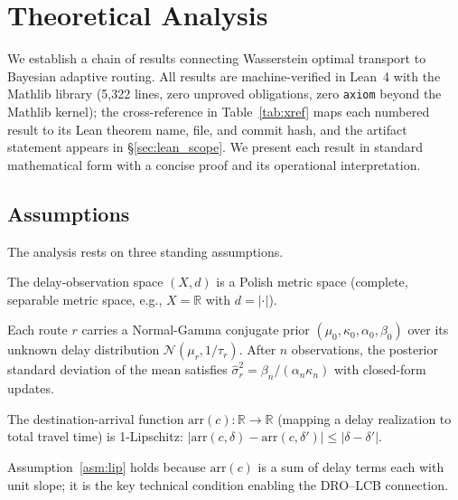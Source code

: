 \documentclass[opre,dblanonrev]{informs4}
\begin{document}
\section{Theoretical Analysis}
\label{sec:lean}

We establish a chain of results connecting Wasserstein optimal transport
to Bayesian adaptive routing.
All results are machine-verified in Lean~4 with the Mathlib library
(5{,}322 lines, zero unproved obligations, zero \texttt{axiom}
beyond the Mathlib kernel); the cross-reference in
Table~\ref{tab:xref} maps each numbered result to its Lean theorem
name, file, and commit hash, and the artifact statement appears in
\S\ref{sec:lean_scope}.
We present each result in standard mathematical form with a concise
proof and its operational interpretation.

\subsection{Assumptions}

The analysis rests on three standing assumptions.

\begin{assumption}\label{asm:polish}
The delay-observation space $(X, d)$ is a Polish metric space
(complete, separable metric space, e.g., $X = \mathbb{R}$ with $d = |\cdot|$).
\end{assumption}

\begin{assumption}\label{asm:prior}
Each route $r$ carries a Normal-Gamma conjugate prior
$(\mu_0, \kappa_0, \alpha_0, \beta_0)$ over its unknown delay distribution
$\mathcal{N}(\mu_r, 1/\tau_r)$.
After $n$ observations, the posterior standard deviation of the mean satisfies
$\hat\sigma_r^2 = \beta_n / (\alpha_n \kappa_n)$ with closed-form updates.
\end{assumption}

\begin{assumption}\label{asm:lip}
The destination-arrival function $\mathrm{arr}(c):\mathbb{R} \to \mathbb{R}$
(mapping a delay realization to total travel time) is 1-Lipschitz:
$|\mathrm{arr}(c,\delta) - \mathrm{arr}(c,\delta')| \leq |\delta - \delta'|$.
\end{assumption}

\noindent Assumption~\ref{asm:lip} holds because $\mathrm{arr}(c)$ is a sum
of delay terms each with unit slope; it is the key technical
condition enabling the DRO--LCB connection.
\end{document}
